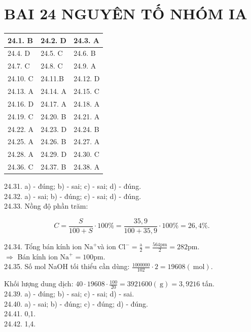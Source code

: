 \documentclass[10pt]{article}
\begin{document}
\section*{BAI 24 NGUYÊN TỐ NHÓM IA}
\begin{center}
\begin{tabular}{|l|l|l|}
\hline
24.1. B & 24.2. D & 24.3. A \\
\hline
24.4. D & 24.5. C & 24.6. B \\
\hline
24.7. C & 24.8. C & 24.9. A \\
\hline
24.10. C & 24.11.B & 24.12. D \\
\hline
24.13. A & 24.14. A & 24.15. C \\
\hline
24.16. D & 24.17. A & 24.18. A \\
\hline
24.19. C & 24.20. B & 24.21. A \\
\hline
24.22. A & 24.23. D & 24.24. B \\
\hline
24.25. A & 24.26. B & 24.27. A \\
\hline
24.28. A & 24.29. D & 24.30. C \\
\hline
24.36. C & 24.37. B & 24.38. A \\
\hline
\end{tabular}
\end{center}

24.31. a) - đúng; b) - sai; c) - sai; d) - đúng.\\
24.32. a) - sai; b) - đúng; c) - sai; d) - đúng.\\
24.33. Nồng độ phần trăm:

$$
C=\frac{S}{100+S} \cdot 100 \%=\frac{35,9}{100+35,9} \cdot 100 \%=26,4 \% .
$$

24.34. Tổng bán kính ion $\mathrm{Na}^{+}$và ion $\mathrm{Cl}^{-}=\frac{\mathrm{a}}{2}=\frac{564 \mathrm{pm}}{2}=282 \mathrm{pm}$.\\
$\Rightarrow$ Bán kính ion $\mathrm{Na}^{+}=100 \mathrm{pm}$.\\
24.35. Số mol NaOH tối thiểu cần dùng: $\frac{1000000}{102} \cdot 2=19608(\mathrm{~mol})$.

Khối lượng dung dịch: $40 \cdot 19608 \cdot \frac{100}{20}=3921600(\mathrm{~g})=3,9216$ tấn.\\
24.39. a) - đúng; b) - sai; c) - sai; d) - sai.\\
24.40. a) - sai; b) - đúng; c) - đúng; d) - đúng.\\
24.41. 0,1.\\
24.42. 1,4.
\end{document}
